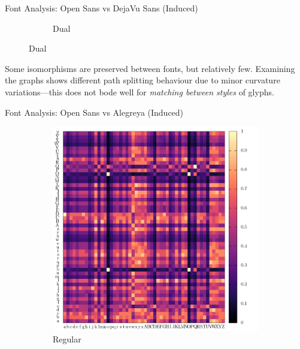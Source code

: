\begin{frame}{Font Analysis: Open Sans vs DejaVu Sans (Induced)}
\begin{figure}
\begin{subfigure}[b]{0.4\linewidth}
			\caption{
				Dual
			}
		\end{subfigure}
	\end{figure}

	Some isomorphisms are preserved between fonts, but relatively few.
	Examining the graphs shows different path splitting behaviour due to minor curvature variations---this does not bode well for \emph{matching between styles} of glyphs.
	
\end{frame}

\begin{frame}{Font Analysis: Open Sans vs Alegreya (Induced)}
	\begin{figure}
		\centering
		\begin{subfigure}[b]{0.4\linewidth}
			\includegraphics[width=\linewidth, height=0.9\linewidth]{../tables/alegreya-dejavu-sans/induced-conf-nrm.pdf}
			\caption{
				Regular
			}
		\end{subfigure}
		\begin{subfigure}[b]{0.4\linewidth}

\end{subfigure}
\end{figure}
\end{frame}
